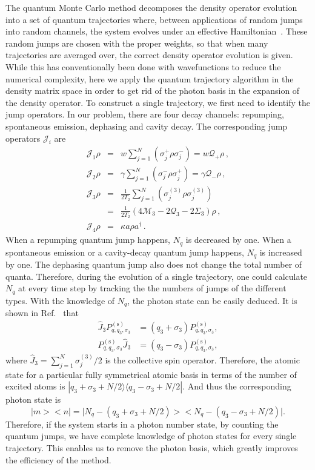 \documentclass[aps,
twocolumn,
showpacs,
superscriptaddress,groupedaddress]{revtex4}
\begin{document}
The quantum Monte Carlo method decomposes the density operator evolution
into a set of quantum trajectories where, between applications of random
jumps into random channels, the system evolves under an effective
Hamiltonian~\cite{Dalibard92,Dum92,Knight98}. These random jumps are chosen with the proper weights, so that when many trajectories are averaged over, the correct density operator evolution is given. While this has
conventionally been done with wavefunctions to reduce the numerical
complexity, here we apply the quantum trajectory algorithm in the
density matrix space in order to get rid of the photon basis in the
expansion of the density operator. To construct a single trajectory, we
first need to identify the jump operators. In our problem, there are
four decay channels: repumping, spontaneous emission, dephasing and
cavity decay. The corresponding jump operators $\mathcal{J}_i$ are
\begin{eqnarray}
\mathcal{J}_1\rho&=&
w\sum_{j=1}^N(\sigma_j^+\rho\sigma_j^-)=w\mathcal{Q}_{+}\rho\,,
\nonumber\\
\mathcal{J}_2\rho&=&
\gamma\sum_{j=1}^N(\sigma_j^-\rho\sigma_j^+)=
\gamma \mathcal{Q}_{-}\rho\,,\nonumber\\
\mathcal{J}_3\rho&=&
\frac{1}{2T_2}\sum_{j=1}^N(\sigma_j^{(3)}\rho\sigma_j^{(3)})
\nonumber\\
&=&\frac{1}{2T_2}(4\mathcal{M}_3-2  \mathcal{Q}_3-2\Sigma_3)\rho\,,
\nonumber\\
\mathcal{J}_4\rho&=&\kappa a\rho a^{\dagger}\,.
\label{jumpo}
\end{eqnarray}
When a repumping quantum jump happens, $N_q$ is decreased by one. When a
spontaneous emission or a cavity-decay quantum jump happens, $N_q$ is
increased by one. The dephasing quantum jump also does not change the
total number of quanta. Therefore, during the evolution of a single
trajectory, one could calculate $N_q$ at every time step by tracking the
the numbers of jumps of the different types. With the knowledge of
$N_q$, the photon state can be easily deduced. It is shown in
Ref.~\cite{PhysRevA.87.062101} that
\begin{equation}
\begin{split}
  \hat{J}_3P_{q,q_3,\sigma_3}^{(\mathrm{s})}&=
  (q_3+\sigma_3)P_{q,q_3,\sigma_3}^{(\mathrm{s})},\\
  P_{q,q_3,\sigma_3}^{(\mathrm{s})}\hat{J}_3&=
  (q_3-\sigma_3)P_{q,q_3,\sigma_3}^{(\mathrm{s})},
\end{split}
\end{equation}
where $\hat{J}_3=\sum_{j=1}^N\sigma_j^{(3)}/2$ is the collective spin
operator. Therefore, the atomic state for a particular fully symmetrical
atomic basis in terms of the number of excited atoms is
$|q_3+\sigma_3+N/2\rangle\langle q_3-\sigma_3+N/2|$. And thus the
corresponding photon state is
\begin{equation}
\bigl|m\bigr>\bigl<n\bigr|=
\bigl|N_q-(q_3+\sigma_3+N/2)\bigr>
\bigl<N_q-(q_3-\sigma_3+N/2)\bigr|.
\end{equation}
Therefore, if the system starts in a photon number state, by counting the quantum jumps, we have complete knowledge of
photon states for every single trajectory. This enables us to remove the
photon basis, which greatly improves the efficiency of the method. 
\end{document}
